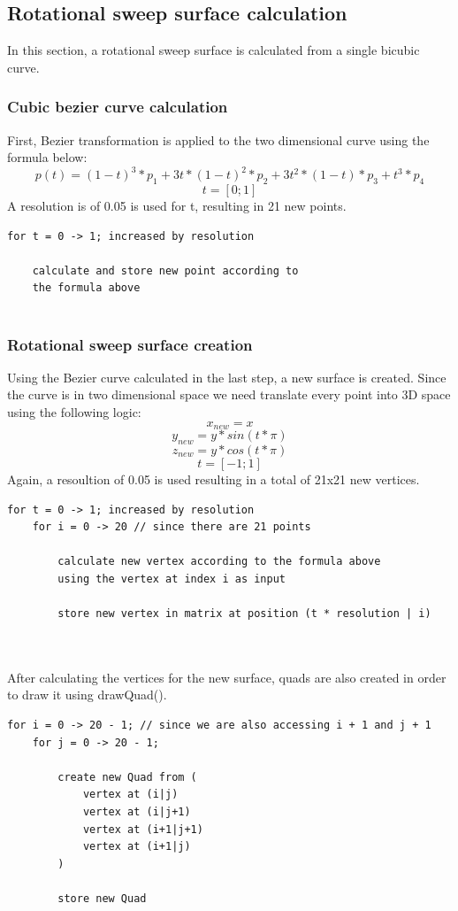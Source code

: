 \documentclass[12pt,a4paper]{scrartcl}
\begin{document}
\subsection{Rotational sweep surface calculation}
In this section, a rotational sweep surface is calculated from a single bicubic curve. 
\subsubsection{Cubic bezier curve calculation}
First, Bezier transformation is applied to the two dimensional curve using the formula below:
$$ p(t) = (1-t)^3*p_1 + 3t*(1-t)^2*p_2 + 3t^2*(1-t)*p_3 + t^3*p_4$$
$$t = [0;1]$$
A resolution is of 0.05 is used for t, resulting in 21 new points.
\begin{lstlisting}[language=PSEUDO]
for t = 0 -> 1; increased by resolution
	
	calculate and store new point according to
	the formula above
	
\end{lstlisting}
\subsubsection{Rotational sweep surface creation}
Using the Bezier curve calculated in the last step, a new surface is created. Since the curve is in two dimensional space we need translate every point into 3D space using the following logic:
$$x_{new} = x$$
$$y_{new} = y * sin(t * \pi)$$
$$z_{new} = y * cos(t * \pi)$$
$$t = [-1;1]$$
Again, a resoultion of 0.05 is used resulting in a total of 21x21 new vertices.
\begin{lstlisting}[language=PSEUDO]
for t = 0 -> 1; increased by resolution
	for i = 0 -> 20 // since there are 21 points
	
		calculate new vertex according to the formula above
		using the vertex at index i as input
		
		store new vertex in matrix at position (t * resolution | i)
\end{lstlisting}
\ \\
\ \\
After calculating the vertices for the new surface, quads are also created in order to draw it using drawQuad().
\begin{lstlisting}[language=PSEUDO]
for i = 0 -> 20 - 1; // since we are also accessing i + 1 and j + 1
	for j = 0 -> 20 - 1;
		
		create new Quad from (
			vertex at (i|j)	
			vertex at (i|j+1)
			vertex at (i+1|j+1)
			vertex at (i+1|j)
		)

		store new Quad
\end{lstlisting}
\end{document}
